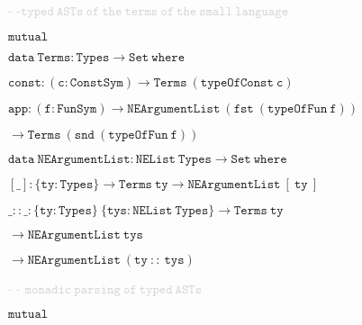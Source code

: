 \vspace{0.25cm}

\hspace{0.25cm}
{\small{\textcolor{lightgray}{- -$\mathtt{typed ~ASTs~of ~the ~terms ~of ~the ~small ~language}$}}}

\hspace{0.25cm}
{\small{$\mathtt{mutual}$}}

\hspace{0.5cm}
{\small{$\mathtt{data ~Terms : Types \to Set ~where}$}}

\hspace{0.75cm}
{\small{$\mathtt{const : (c : ConstSym) \to Terms ~(typeOfConst ~c)}$}}

\hspace{0.75cm}
{\small{$\mathtt{app : (f : FunSym) \to NEArgumentList ~(fst ~(typeOfFun ~f))}$}}

\vspace{-0.1cm}

\hspace{3.7cm}
{\small{$\mathtt{\to Terms ~(snd ~(typeOfFun ~f))}$}}

\vspace{0.25cm}

\hspace{0.5cm}
{\small{$\mathtt{data ~NEArgumentList : NEList ~Types \to Set ~where}$}}

\hspace{0.75cm}
{\small{$\mathtt{[\_]  : \{ty : Types\} \to Terms ~ty \to NEArgumentList ~[ ~ty~ ]}$}}

\hspace{0.75cm}
{\small{$\mathtt{\_::\!\_ : \{ty : Types\} ~\{tys : NEList ~Types\} \to Terms ~ty}$}}

\vspace{-0.1cm}

\hspace{7.5cm}
{\small{$\mathtt{\to NEArgumentList ~tys}$}}

\vspace{-0.1cm}

\hspace{7.5cm}
{\small{$\mathtt{\to  NEArgumentList ~(ty ~::~ tys)}$}}

\vspace{0.25cm}

\hspace{0.25cm}
{\small{\textcolor{lightgray}{- - $\mathtt{monadic ~parsing ~of ~typed ~ASTs}$}}}

\hspace{0.25cm}
{\small{$\mathtt{mutual}$}}

